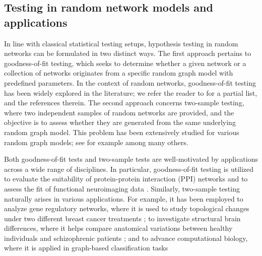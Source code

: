 \documentclass[12pt]{article}
\numberwithin{equation}{section}
\begin{document}
\subsection{Testing in random network models and applications} In line with classical statistical testing setups, hypothesis testing in random networks can be formulated in two distinct ways. The first approach pertains to goodness-of-fit testing, which seeks to determine whether a given network or a collection of networks originates from a specific random graph model with predefined parameters. In the context of random networks, goodness-of-fit testing has been widely explored in the literature; we refer the reader to \cite{xu2021stein, dan2020goodness, GOF_sbm, brune2025goodness, jin2025network, maugis2020testing, oudah2020, gao2017subgraph,li2013assessing,csiszar2012testing,Chung-Lu} for a partial list, and the references therein. The second approach concerns two-sample testing, where two independent samples of random networks are provided, and the objective is to assess whether they are generated from the same underlying random graph model. This problem has been extensively studied for various random graph models; see for example \cite{chatterjee2023two, ghoshdastidar2017networkstatistics, ghoshdastidar2020two, dotproduct2018statistical, tang2017nonparametric, agterberg2020nonparametric} among many others.


Both goodness-of-fit tests and two-sample tests are well-motivated by applications across a wide range of disciplines. In particular, goodness-of-fit testing is utilized to evaluate the suitability of protein-protein interaction (PPI) networks \cite{ospina2019assessment, elliott2018nonparametric} and to assess the fit of functional neuroimaging data \cite{Ginestet2015}. Similarly, two-sample testing naturally arises in various applications. For example, it has been employed to analyze gene regulatory networks, where it is used to study topological changes under two different breast cancer treatments \cite{zhang2009differential}; to investigate structural brain differences, where it helps compare anatomical variations between healthy individuals and schizophrenic patients \cite{bassett2008hierarchical}; and to advance computational biology, where it is applied in graph-based classification tasks \cite{shervashidze11a}
\end{document}
